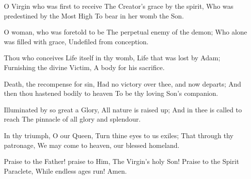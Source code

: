 
O Virgin who was first to receive
The Creator’s grace by the spirit,
Who was predestined by the Most High
To bear in her womb the Son.

O woman, who was foretold to be
The perpetual enemy of the demon;
Who alone was filled with grace,
Undefiled from conception.

Thou who conceives Life itself in thy womb,
Life that was lost by Adam;
Furnishing the divine Victim,
A body for his sacrifice.

Death, the recompense for sin,
Had no victory over thee, and now departs;
And then thou hastened bodily to heaven
To be thy loving Son’s companion.

Illuminated by so great a Glory,
All nature is raised up;
And in thee is called to reach
The pinnacle of all glory and splendour.

In thy triumph, O our Queen,
Turn thine eyes to us exiles;
That through thy patronage,
We may come to heaven, our blessed homeland.

Praise to the Father! praise to Him,
The Virgin’s holy Son!
Praise to the Spirit Paraclete,
While endless ages run!
Amen.